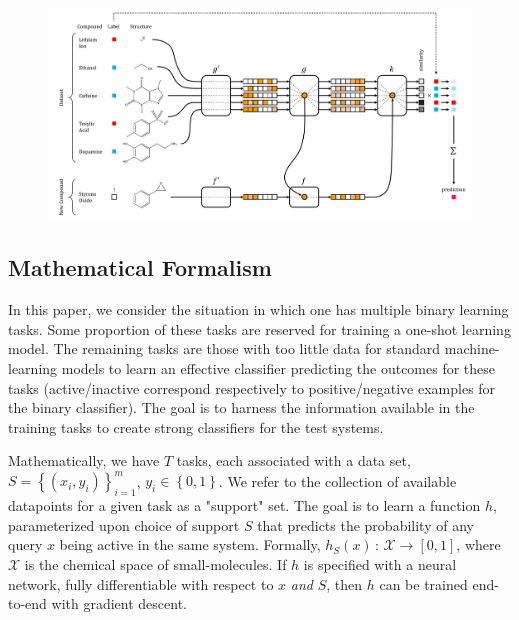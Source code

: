 \documentclass[journal=jacsat,manuscript=article]{achemso}
\providecommand{\DIFaddend}{} %
\begin{document}
\begin{figure}[h]
\includegraphics[width=\textwidth]{schematic_v2.png}
\label{fig:schematic}
\end{figure}
\DIFaddend 

\subsection{Mathematical Formalism}

In this paper, we consider the situation in which one has multiple binary learning tasks. Some proportion of these tasks are reserved for training a one-shot learning model. The remaining tasks are those with too little data for standard machine-learning models to learn an effective classifier predicting the outcomes for these tasks (active/inactive correspond respectively to positive/negative examples for the binary classifier). The goal is to harness the information available in the training tasks to create strong classifiers for the test systems. 


Mathematically, we have $T$ tasks, each associated with a data set, $S=\left\{\left(x_i,y_i\right)\right\}_{i=1}^{m}$, $y_i\in\left\{0,1\right\}$. We refer to the collection of available datapoints for a given task as a "support" set. The goal is to learn a function $h$, parameterized upon choice of support $S$ that predicts the probability of any query $x$ being active in the same system. Formally, $h_S(x)\,:\,\mathcal{X}\rightarrow\left[0,1\right]$, where $\mathcal{X}$ is the chemical space of small-molecules. If $h$ is specified with a neural network, fully differentiable with respect to $x$ \emph{and} $S$, then $h$ can be trained end-to-end with gradient descent.
\end{document}
